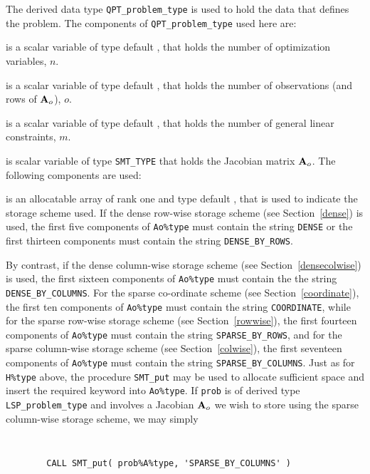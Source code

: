 \documentclass{galahad}
\newcommand{\packagename}{LSP}
\begin{document}
The derived data type 
{\tt QPT\_problem\_type}
is used to hold the data that defines the problem.
The components of 
{\tt QPT\_problem\_type} used here are:

\begin{description}

 is a scalar variable of type default \integer, 
 that holds the number of optimization variables, $n$.  
              
 is a scalar variable of type default \integer, 
 that holds the number of observations (and rows of ${\mathbf{A}}_o$), $o$.
              
 is a scalar variable of type default \integer, 
 that holds the number of general linear constraints, $m$.
              
 is scalar variable of type {\tt SMT\_TYPE} 
that holds the Jacobian matrix ${\mathbf{A}}_o$. The following components are used:

\begin{description}

 is an allocatable array of rank one and type default \character, 
that is used to indicate the storage scheme used. If the dense row-wise 
storage scheme (see Section~\ref{dense}) is used, 
the first five components of {\tt Ao\%type} must contain the
string {\tt DENSE} or the first thirteen components must contain the
string {\tt DENSE\_BY\_ROWS}.

By contrast, if the dense column-wise storage scheme 
(see Section~\ref{densecolwise}) is used, 
the first sixteen components of {\tt Ao\%type} must contain the
the string {\tt DENSE\_BY\_COLUMNS}.
For the sparse co-ordinate scheme (see Section~\ref{coordinate}), 
the first ten components of {\tt Ao\%type} must contain the
string {\tt COORDINATE}, while 
for the sparse row-wise storage scheme (see Section~\ref{rowwise}),
the first fourteen components of {\tt Ao\%type} must contain the
string {\tt SPARSE\_BY\_ROWS},
and for the sparse column-wise storage scheme (see Section~\ref{colwise}),
the first seventeen components of {\tt Ao\%type} must contain the
string {\tt SPARSE\_BY\_COLUMNS}.
Just as for {\tt H\%type} above, the procedure {\tt SMT\_put} 
may be used to allocate sufficient space and insert the required keyword
into {\tt Ao\%type}.
If {\tt prob} is of derived type {\tt \packagename\_problem\_type}
and involves a Jacobian ${\mathbf{A}}_o$ we wish to store using the sparse column-wise 
storage scheme, we may simply
{\tt 
\begin{verbatim}
        CALL SMT_put( prob%A%type, 'SPARSE_BY_COLUMNS' )
\end{verbatim}
}
\noindent


\end{description}
\end{description}
\end{document}
